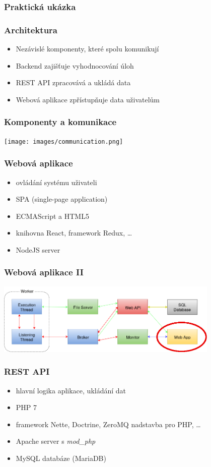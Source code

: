 \documentclass{beamer}
\begin{document}
\begin{frame}
	\frametitle{Praktická ukázka}
\end{frame}

\begin{frame}
	\frametitle{Architektura}
	\begin{itemize}
		\item Nezávislé komponenty, které spolu komunikují
		\item Backend zajišťuje vyhodnocování úloh
		\item REST API zpracovává a ukládá data
		\item Webová aplikace zpřístupňuje data uživatelům
	\end{itemize}
\end{frame}

\begin{frame}
	\frametitle{Komponenty a komunikace}
	\begin{center}
		\texttt{[image: images/communication.png]}
	\end{center}
\end{frame}

\begin{frame}
	\frametitle{Webová aplikace}
	\begin{itemize}
		\item ovládání systému uživateli
		\item SPA (single-page application)
		\item ECMAScript a HTML5
		\item knihovna React, framework Redux, \dots
		\item NodeJS server
	\end{itemize}
\end{frame}

\begin{frame}
	\frametitle{Webová aplikace II}
	\begin{center}
		\includegraphics[width=0.8\textwidth]{images/communication-webapp.png}
	\end{center}
\end{frame}

\begin{frame}
	\frametitle{REST API}
	\begin{itemize}
		\item hlavní logika aplikace, ukládání dat
		\item PHP 7
		\item framework Nette, Doctrine, ZeroMQ nadstavba pro PHP, \dots
		\item Apache server s {\it mod\_php}
		\item MySQL databáze (MariaDB)
	\end{itemize}
\end{frame}
\end{document}

